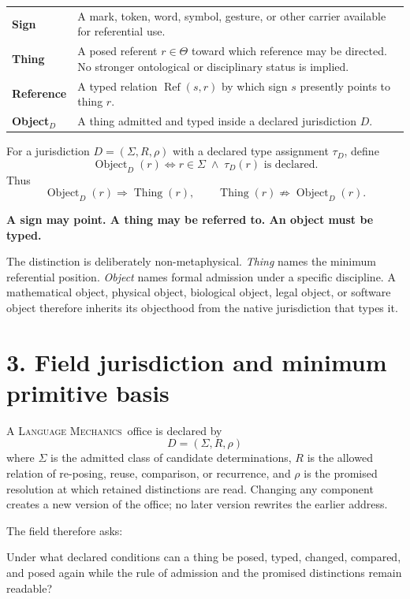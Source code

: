 \documentclass[10.5pt]{article}
\newcommand{\LM}{\textsc{Language Mechanics}}
\newcommand{\LMRef}{\operatorname{Ref}}
\newcommand{\LMThing}{\operatorname{Thing}}
\newcommand{\LMObject}{\operatorname{Object}}
\begin{document}
\begin{center}
\begin{tabularx}{0.96\textwidth}{>{\bfseries}p{}X}
\toprule
Sign & A mark, token, word, symbol, gesture, or other carrier available for referential use.\\
Thing & A posed referent $r\in\Theta$ toward which reference may be directed. No stronger ontological or disciplinary status is implied.\\
Reference & A typed relation $\LMRef(s,r)$ by which sign $s$ presently points to thing $r$.\\
Object$_D$ & A thing admitted and typed inside a declared jurisdiction $D$.\\
\bottomrule
\end{tabularx}
\end{center}

For a jurisdiction $D=(\Sigma,R,\rho)$ with a declared type assignment $\tau_D$, define
\[
\LMObject_D(r)
\iff
r\in\Sigma\;\wedge\;\tau_D(r)\text{ is declared}.
\]
Thus
\[
\boxed{\LMObject_D(r)\Longrightarrow\LMThing(r),}
\qquad
\boxed{\LMThing(r)\not\Longrightarrow\LMObject_D(r).}
\]

\begin{certbox}
\centering
\textbf{A sign may point. A thing may be referred to. An object must be typed.}
\end{certbox}

The distinction is deliberately non-metaphysical. \emph{Thing} names the minimum referential position. \emph{Object} names formal admission under a specific discipline. A mathematical object, physical object, biological object, legal object, or software object therefore inherits its objecthood from the native jurisdiction that types it.

\section*{3. Field jurisdiction and minimum primitive basis}
A \LM\ office is declared by
\[
\boxed{D=(\Sigma,R,\rho)}
\]
where $\Sigma$ is the admitted class of candidate determinations, $R$ is the allowed relation of re-posing, reuse, comparison, or recurrence, and $\rho$ is the promised resolution at which retained distinctions are read. Changing any component creates a new version of the office; no later version rewrites the earlier address.

The field therefore asks:
\begin{rulebox}
\centering
Under what declared conditions can a thing be posed, typed, changed, compared, and posed again while the rule of admission and the promised distinctions remain readable?
\end{rulebox}
\end{document}
